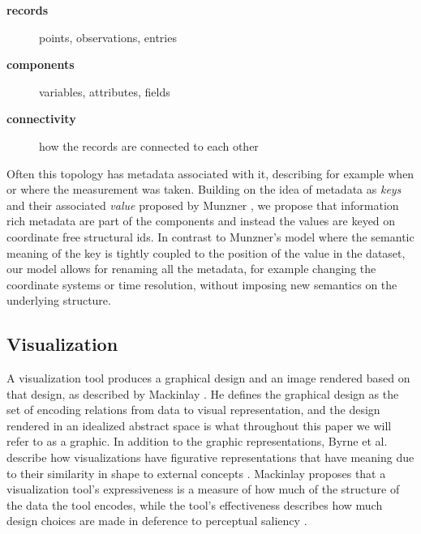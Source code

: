 \documentclass[../main.tex]{subfiles}
\begin{document}
\begin{mdframed}[roundcorner=10pt, frametitle= definitions, frametitlerule=true, frametitlebackgroundcolor=gray!10]
    \begin{description}
        \item[\textbf{records}] points, observations, entries 
        \item[\textbf{components}] variables, attributes, fields 
        \item[\textbf{connectivity}] how the records are connected to each other
    \end{description}
\end{mdframed}

Often this topology has metadata associated with it, describing for example when or where the measurement was taken. Building on the idea of metadata as \textit{keys} and their associated \textit{value} proposed by Munzner \cite{munznerChDataAbstraction}, we propose that information rich metadata are part of the components and instead the values are keyed on coordinate free structural ids. In contrast to Munzner's model where the semantic meaning of the key is tightly coupled to the position of the value in the dataset, our model allows for renaming all the metadata, for example changing the coordinate systems or time resolution, without imposing new semantics on the underlying structure.

\subsection{Visualization}
A visualization tool produces a graphical design and an image rendered based on that design, as described by Mackinlay \cite{mackinlayAUTOMATICDESIGNGRAPHICAL1987}. He defines the graphical design as the set of encoding relations from data to visual representation\cite{mackinlayAutomatingDesignGraphical1986}, and the design rendered in an idealized abstract space is what throughout this paper we will refer to as a graphic. In addition to the graphic representations, Byrne et al. describe how visualizations have figurative representations that have meaning due to their similarity in shape to external concepts \cite{byrneAcquiredCodesMeaning2016}. Mackinlay  proposes that a visualization tool's expressiveness is a measure of how much of the structure of the data the tool encodes, while the tool's effectiveness describes how much design choices are made in deference to perceptual saliency \cite{clevelandResearchStatisticalGraphics1987,clevelandGraphicalPerceptionTheory1984,chambersGraphicalMethodsData1983a, munznerVisualizationAnalysisDesign2014}.
\end{document}
